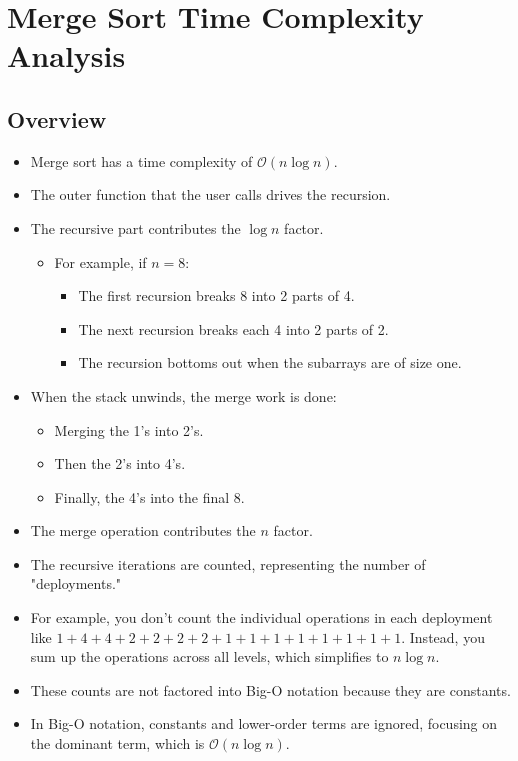 \documentclass{article}
\begin{document}
\section*{Merge Sort Time Complexity Analysis}

\subsection*{Overview}
\begin{itemize}
    \item Merge sort has a time complexity of \( \mathcal{O}(n \log n) \).
    \item The outer function that the user calls drives the recursion.
    \item The recursive part contributes the \( \log n \) factor.
        \begin{itemize}
            \item For example, if \( n = 8 \):
            \begin{itemize}
                \item The first recursion breaks 8 into 2 parts of 4.
                \item The next recursion breaks each 4 into 2 parts of 2.
                \item The recursion bottoms out when the subarrays are of size one.
            \end{itemize}
        \end{itemize}
    \item When the stack unwinds, the merge work is done:
        \begin{itemize}
            \item Merging the 1’s into 2’s.
            \item Then the 2’s into 4’s.
            \item Finally, the 4’s into the final 8.
        \end{itemize}
    \item The merge operation contributes the \( n \) factor.
    \item The recursive iterations are counted, representing the number of "deployments."
    \item For example, you don’t count the individual operations in each deployment like \(1+4+4+2+2+2+2+1+1+1+1+1+1+1+1\). Instead, you sum up the operations across all levels, which simplifies to \( n \log n \).
    \item These counts are not factored into Big-O notation because they are constants.
    \item In Big-O notation, constants and lower-order terms are ignored, focusing on the dominant term, which is \( \mathcal{O}(n \log n) \).
\end{itemize}
\end{document}
